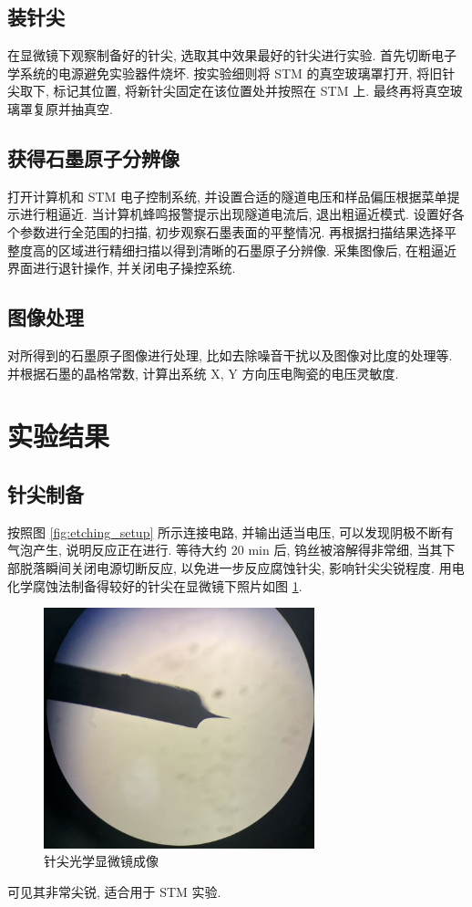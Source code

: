 \documentclass[12pt]{ctexart} %
\begin{document}
\subsection{装针尖}
在显微镜下观察制备好的针尖, 选取其中效果最好的针尖进行实验.
首先切断电子学系统的电源避免实验器件烧坏. 按实验细则将 STM 的真空玻璃罩打开, 将旧针尖取下, 标记其位置, 将新针尖固定在该位置处并按照在 STM 上. 最终再将真空玻璃罩复原并抽真空.

\subsection{获得石墨原子分辨像}
打开计算机和 STM 电子控制系统, 并设置合适的隧道电压和样品偏压根据菜单提示进行粗逼近.
当计算机蜂鸣报警提示出现隧道电流后, 退出粗逼近模式. 设置好各个参数进行全范围的扫描, 初步观察石墨表面的平整情况. 再根据扫描结果选择平整度高的区域进行精细扫描以得到清晰的石墨原子分辨像.
采集图像后, 在粗逼近界面进行退针操作, 并关闭电子操控系统.

\subsection{图像处理}
对所得到的石墨原子图像进行处理, 比如去除噪音干扰以及图像对比度的处理等. 并根据石墨的晶格常数, 计算出系统 X, Y 方向压电陶瓷的电压灵敏度.

\section{实验结果}
\subsection{针尖制备}
按照图 \ref{fig:etching_setup} 所示连接电路, 并输出适当电压, 可以发现阴极不断有气泡产生, 说明反应正在进行. 等待大约 20 min 后, 钨丝被溶解得非常细, 当其下部脱落瞬间关闭电源切断反应, 以免进一步反应腐蚀针尖, 影响针尖尖锐程度.
用电化学腐蚀法制备得较好的针尖在显微镜下照片如图 \ref{fig:tip_image}.

\begin{figure}[htbp]
 \centering
 \includegraphics[width=0.7\textwidth]{FIG3.jpg} %
 \caption{针尖光学显微镜成像}
 \label{fig:tip_image}
\end{figure}
可见其非常尖锐, 适合用于 STM 实验.
\end{document}
